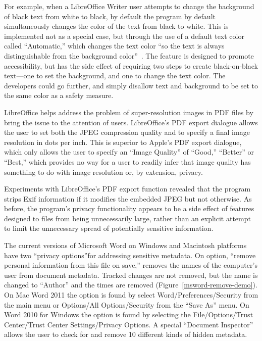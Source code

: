 \documentclass{article}
\begin{document}
For example, when a LibreOffice Writer user attempts to change the
background of black text from white to black,  by default the program by default
simultaneously changes the color of the text from black to white. This is implemented not as a special case, but
through the use of a  default text color called ``Automatic,'' which
changes the text color ``so the text is always distinguishable from the background
color''~\cite{libreoffice-accessibility}. The feature is designed to
promote accessibility, but has the side effect of requiring two steps
to create black-on-black text---one  to set the background, and
one  to change the text color. The developers could go 
further, and simply disallow text and background to be set to the same
color as a safety measure.

LibreOffice helps address the problem of super-resolution images in
PDF files by bring the issue to the attention of users. 
LibreOffice's PDF export dialogue allows the user to set both the JPEG
compression quality and to specify a final image resolution in dots
per inch. This is superior to
Apple's PDF export dialogue, which only allows the user to specify
an ``Image Quality'' of ``Good,'' ``Better'' or ``Best,'' which provides no way for a user to readily
infer that image quality has something to do with image resolution or,
by extension, privacy.

Experiments with LibreOffice's PDF export function revealed that the
program strips Exif information if it modifies the embedded JPEG but
not otherwise. As before, the program's privacy functionality appears to
be a side effect of features designed to files from being
unnecessarily large, rather than an explicit attempt to limit the
unnecessary spread of potentially sensitive information. 

The current versions of Microsoft Word on Windows and Macintosh
platforms have two ``privacy options''for addressing sensitive metadata. On
option, ``remove personal information from this file on save,''
removes the names of the computer's user from document
metadata. Tracked changes are not removed, but the name is changed
to ``Author'' and the times are removed
(Figure~\ref{msword-remove-demo}). On Mac Word 2011 the option is found by
select Word/Preferences/Security from the main menu or Options/All
Options/Security from the ``Save As'' menu. On Word 2010 for Windows
the option is found by selecting the File/Options/Trust Center/Trust
Center Settings/Privacy Options. A special ``Document Inspector''
allows the user to check for and remove 10 different kinds of hidden
metadata. 
\end{document}
